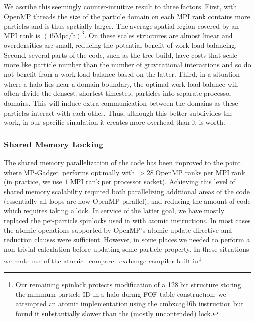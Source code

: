 \documentclass[fleqn,usenatbib]{mnras}
\newcommand{\software}[1]{{\small #1}}
\newcommand{\mpgadget}{\software{MP-Gadget}}
\begin{document}
We ascribe this seemingly counter-intuitive result to three factors.
First, with OpenMP threads the size of the particle domain on each MPI rank contains more particles and is thus spatially larger. The average spatial region covered by an MPI rank is $(15 \mathrm{Mpc/h})^3$. On these scales structures are almost linear and overdensities are small, reducing the potential benefit of work-load balancing. Second, several parts of the code, such as the tree-build, have costs that scale more like particle number than the number of gravitational interactions and so do not benefit from a work-load balance based on the latter. Third, in a situation where a halo lies near a domain boundary, the optimal work-load balance will often divide the densest, shortest timestep, particles into separate processor domains. This will induce extra communication between the domains as these particles interact with each other. Thus, although this better subdivides the work, in our specific simulation it creates more overhead than it is worth.

\subsubsection{Shared Memory Locking}
\label{sec:locking}

The shared memory parallelization of the code has been improved to the point where \mpgadget~performs optimally with $>28 $ OpenMP ranks per MPI rank (in practice, we use $1$ MPI rank per processor socket).
Achieving this level of shared memory scalability required both parallelizing additional areas of the code (essentially all loops are now OpenMP parallel), and reducing the amount of code which requires taking a lock. In service of the latter goal, we have mostly replaced the per-particle spinlocks used in \cite{Feng:2016} with atomic instructions. In most cases the atomic operations supported by OpenMP's atomic update directive and reduction clauses were sufficient. However, in some places we needed to perform a non-trivial calculation before updating some particle property. In these situations we make use of the atomic\_compare\_exchange compiler built-in\footnote{Our remaining spinlock protects modification of a 128 bit structure storing the minimum particle ID in a halo during FOF table construction: we attempted an atomic implementation using the cmbxchg16b instruction but found it substantially slower than the (mostly uncontended) lock.}.

\end{document}
